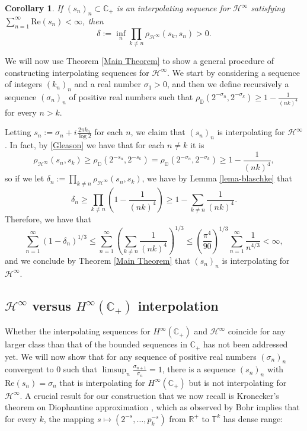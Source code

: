 \documentclass[preprint,12pt,number]{elsarticle}
\newtheorem{corollary}[teo]{Corollary}
\newcommand{\R}{\mathbb{R}}
\newcommand{\C}{\mathbb{C}}
\newcommand{\D}{\mathbb{D}}
\newcommand{\T}{\mathbb{T}}
\begin{document}
\begin{corollary}
    If $(s_n)_n\subset\C_+$ is an interpolating sequence for $\mathscr{H}^{\infty}$ satisfying $\sum_{n=1}^\infty \text{Re}(s_n)<\infty$, then 
    \[
    \delta:=\inf_n \prod_{k\neq n}\rho_{\mathscr{H}^{\infty}}(s_k,s_n)>0.
    \]
\end{corollary}

We will now use Theorem \ref{Main Theorem} to show a general procedure of constructing interpolating sequences for $\mathscr{H}^{\infty}$. We start by considering a sequence of integers $(k_n)_n$ and a real number $\sigma_1>0$, and then we define recursively a sequence $(\sigma_n)_n$ of positive real numbers such that $\rho_\D(2^{-\sigma_n},2^{-\sigma_k})\geq 1-\frac{1}{(nk)^4}$ for every $n>k$. 

Letting $s_n:=\sigma_n+i\frac{2\pi k_n}{\log2}$ for each $n$, we claim that $(s_n)_n$ is interpolating for $\mathscr{H}^{\infty}$. In fact, by \eqref{Gleason} we have that for each $n\neq k$ it is 
\[
\rho_{\mathscr{H}^{\infty}}(s_n,s_k)\geq\rho_\D(2^{-s_n},2^{-s_k})=\rho_\D(2^{-\sigma_n},2^{-\sigma_k})\geq 1-\frac{1}{(nk)^4},
\] 
so if we let $\delta_n:=\prod_{k\neq n}\rho_{\mathscr{H}^{\infty}}(s_n,s_k)$, we have by Lemma \ref{lema-blaschke} that 
\[
\delta_n\geq \prod_{k\neq n}\left(1-\frac{1}{(nk)^4}\right)\geq 1- \sum_{k\neq n} \frac{1}{(nk)^4}.
\] 
Therefore, we have that 
\[
\sum_{n=1}^\infty(1-\delta_n)^{1/3}\leq \sum_{n=1}^\infty \left(\sum_{k\neq n} \frac{1}{(nk)^4}\right)^{1/3} \leq \left(\frac{\pi^4}{90}\right)^{1/3}\sum_{n=1}^\infty\frac{1}{n^{4/3}}<\infty,
\] 
and we conclude by Theorem \ref{Main Theorem} that $(s_n)_n$ is interpolating for $\mathscr{H}^{\infty}$.
\vspace{0.3cm}
\subsection{$\mathscr{H}^{\infty}$ versus $H^\infty(\C_+)$ interpolation} 
\vspace{0.3cm}
Whether the interpolating sequences for $H^\infty(\C_+)$ and $\mathscr{H}^{\infty}$ coincide for any larger class than that of the bounded sequences in $\C_+$ has not been addressed yet. We will now show that for any sequence of positive real numbers $(\sigma_n)_n$ convergent to $0$ such that $\limsup_n\frac{\sigma_{n+1}}{\sigma_n}=1$, there is a sequence $(s_n)_n$ with $\text{Re} (s_n)=\sigma_n$ that is interpolating for $H^\infty(\C_+)$ but is not interpolating for $\mathscr{H}^{\infty}$. A crucial result for our construction that we now recall is Kronecker's theorem on Diophantine approximation \cite[Ch. XXIII]{HardyWright2008}, which as observed by Bohr implies that for every $k$, the mapping $s\mapsto(2^{-s},\dots, p_k^{-s})$ from $\R^+$ to $\T^k$ has dense range: 
\end{document}
